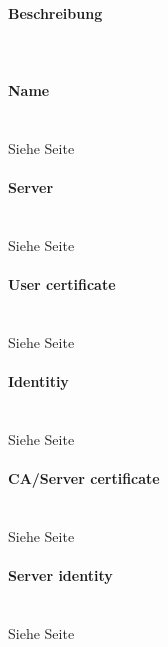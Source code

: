 \begin{minipage}[t]{0.5\textwidth}
\vspace{0pt}
\paragraph{Beschreibung}\mbox{}\\
\paragraph{Name}\mbox{}\\
Siehe Seite \pageref{name} \\

\paragraph{Server}\mbox{}\\
Siehe Seite \pageref{server} \\

\paragraph{User certificate}\mbox{}\\
Siehe Seite \pageref{usercertificate} \\

\paragraph{Identitiy}\mbox{}\\
Siehe Seite \pageref{identitiy} \\

\paragraph{CA/Server certificate}\mbox{}\\
Siehe Seite \pageref{servercertificate} \\

\paragraph{Server identity}\mbox{}\\
Siehe Seite \pageref{serveridentitiy} \\

\end{minipage}
\newpage


